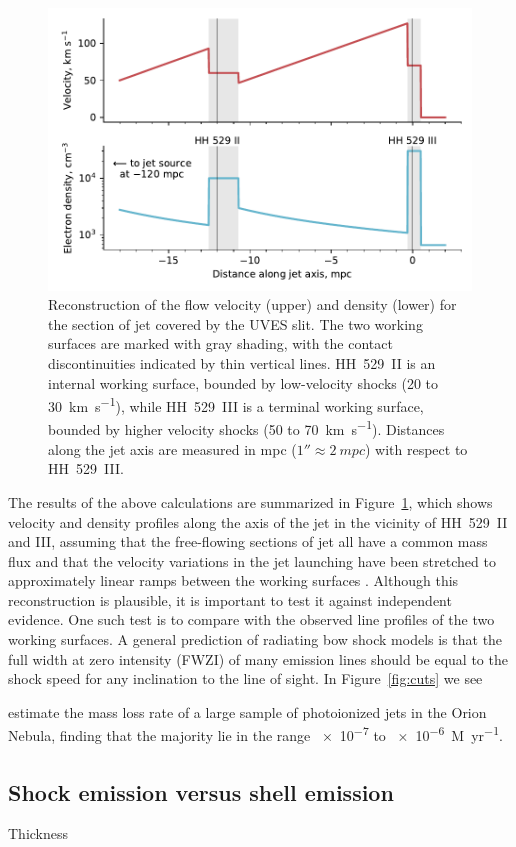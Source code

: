 \documentclass[useAMS, usenatbib]{mnras}
\begin{document}
\begin{figure}
  \centering
  \includegraphics[width=\linewidth]{hh529-ii-iii-ws-profiles}
  \caption{
    Reconstruction of the flow velocity (upper)
    and density (lower)
    for the section of jet covered by the UVES slit.
    The two working surfaces are marked with gray shading,
    with the contact discontinuities indicated by thin vertical lines.
    HH~529~II is an internal working surface, bounded by low-velocity shocks (\num{20} to \SI{30}{km.s^{-1}}),
    while HH~529~III is a terminal working surface, bounded by higher velocity shocks (\num{50} to \SI{70}{km.s^{-1}}).
    Distances along the jet axis are measured in mpc (\(1'' \approx \SI{2}{mpc}\))
    with respect to HH~529~III.
  }
  \label{fig:ws-profiles}
\end{figure}

The results of the above calculations are summarized in Figure~\ref{fig:ws-profiles},
which shows velocity and density profiles along the axis of the jet
in the vicinity of HH~529~II and III,
assuming that the free-flowing sections of jet all have a common mass flux
and that the velocity variations in the jet launching have been stretched
to approximately linear ramps between the working surfaces
\citetext{see models of \citealp{Raga:1990a}}.
Although this reconstruction is plausible, it is important to test it
against independent evidence.
One such test is to compare with the observed line profiles of the two working surfaces.
A general prediction of radiating bow shock models is that the
full width at zero intensity (FWZI) of many emission lines
should be equal to the shock speed \citep{Hartigan:1987a}
for any inclination to the line of sight.
In Figure~\ref{fig:cuts} we see


\citet{Bally:2006a} estimate the mass loss rate of a large sample of photoionized jets in the Orion Nebula, finding that the majority lie in the range \num{e-7} to \SI{e-6}{M_\odot.yr^{-1}}.  



\subsection{Shock emission versus shell emission}
\label{sec:shock-emiss-vers}

Thickness \citep{Falle:1993a}


\end{document}
